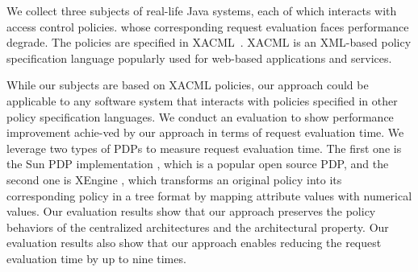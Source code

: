 



We collect three subjects of real-life Java systems, each of which interacts with access control policies. 
whose corresponding request evaluation faces performance degrade. The policies are specified in XACML~\cite{sunxacml}.
XACML is an XML-based policy specification language popularly used for web-based applications and services.

While our subjects are based on XACML policies, our approach could be applicable to any software system that interacts with policies specified in other
policy specification languages. We conduct an evaluation to show performance improvement achie-ved by our approach in terms of request evaluation time.
We leverage two types of PDPs to measure request evaluation time. The first one is the
Sun PDP implementation \cite{oasis}, which is a popular open source PDP, and the second one is XEngine \cite{Xengine}, which transforms an original policy
into its corresponding policy in a tree format by mapping attribute values with numerical values.
Our evaluation results show that our approach
preserves the policy behaviors of the centralized architectures and the architectural property. Our evaluation results also show that our approach
enables reducing the request evaluation time by up to nine times.




